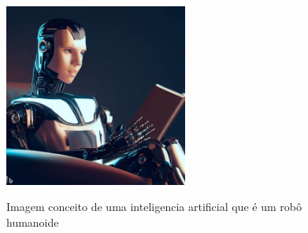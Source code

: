 \begin{figure}[ht]
	\caption{Imagem conceito de uma inteligencia artificial que é um robô humanoide}
	\centering %
	\includegraphics[width=6cm]{figures/ia_concept.jpg} %
	\label{fig:ia_concept}
\end{figure}



